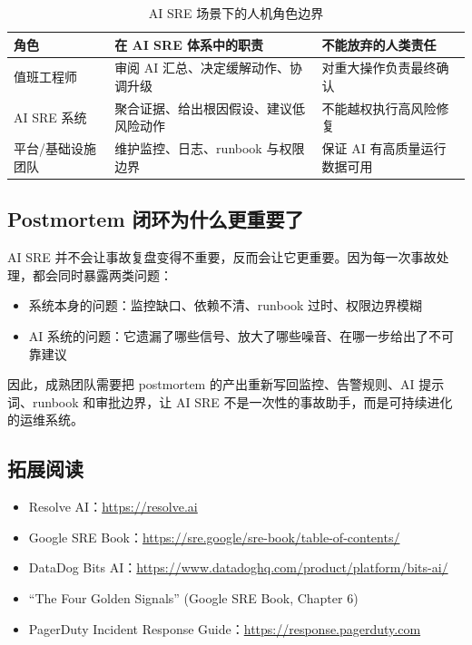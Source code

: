 \documentclass[a4paper]{article}
\begin{document}
\begin{table}[H]
\centering
\begin{tabular}{p{} p{} p{}}
\toprule
角色 & 在 AI SRE 体系中的职责 & 不能放弃的人类责任 \\
\midrule
值班工程师 & 审阅 AI 汇总、决定缓解动作、协调升级 & 对重大操作负责最终确认 \\
AI SRE 系统 & 聚合证据、给出根因假设、建议低风险动作 & 不能越权执行高风险修复 \\
平台/基础设施团队 & 维护监控、日志、runbook 与权限边界 & 保证 AI 有高质量运行数据可用 \\
\bottomrule
\end{tabular}
\caption{AI SRE 场景下的人机角色边界}
\end{table}

\subsection{Postmortem 闭环为什么更重要了}

AI SRE 并不会让事故复盘变得不重要，反而会让它更重要。因为每一次事故处理，都会同时暴露两类问题：

\begin{itemize}
    \item 系统本身的问题：监控缺口、依赖不清、runbook 过时、权限边界模糊
    \item AI 系统的问题：它遗漏了哪些信号、放大了哪些噪音、在哪一步给出了不可靠建议
\end{itemize}

因此，成熟团队需要把 postmortem 的产出重新写回监控、告警规则、AI 提示词、runbook 和审批边界，让 AI SRE 不是一次性的事故助手，而是可持续进化的运维系统。

\subsection{拓展阅读}

\begin{itemize}
    \item Resolve AI：\url{https://resolve.ai}
    \item Google SRE Book：\url{https://sre.google/sre-book/table-of-contents/}
    \item DataDog Bits AI：\url{https://www.datadoghq.com/product/platform/bits-ai/}
    \item ``The Four Golden Signals'' (Google SRE Book, Chapter 6)
    \item PagerDuty Incident Response Guide：\url{https://response.pagerduty.com}
\end{itemize}

\end{document}
